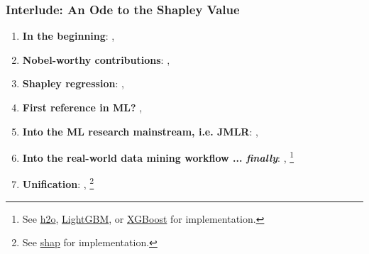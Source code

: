 \documentclass[11pt,
               aspectratio=169,
               hyperref={colorlinks}
               ]{beamer}
\begin{document}
	\begin{frame}
		
		\frametitle{\textbf{Interlude}: An Ode to the Shapley Value}		
		
		\begin{enumerate}\footnotesize
				
			\item \textbf{In the beginning}: ,  \cite{shapley1953value}
			\item \textbf{Nobel-worthy contributions}: ,  \cite{shapley1988shapley}
			\item \textbf{Shapley regression}: ,  \cite{lipovetsky2001analysis}
			\item \textbf{First reference in ML?} ,  \cite{keinan2004fair}
			\item \textbf{Into the ML research mainstream, i.e. JMLR}: ,  \cite{kononenko2010efficient}
			\item \textbf{Into the real-world data mining workflow ... \textit{finally}}: , \footnote{\tiny{See \href{https://github.com/h2oai/h2o-3}{h2o}, \href{https://github.com/microsoft/LightGBM}{LightGBM}, or \href{https://github.com/dmlc/xgboost}{XGBoost} for implementation.}} \cite{tree_shap} 
			\item \textbf{Unification}: , \footnote{\tiny{See \href{https://github.com/slundberg/shap}{shap} for implementation.}} \cite{shapley}
				
		\end{enumerate}
			
	\end{frame}
	
\end{document}
